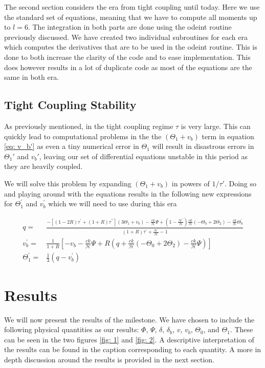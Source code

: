 \documentclass[a4paper, 10pt, reqno]{amsart}
\begin{document}
The second section considers the era from tight coupling until today. Here we use the standard set of equations, meaning that we have to compute all moments up to $l = 6$. The integration in both parts are done using the odeint routine previously discussed. We have created two individual subroutines for each era which computes the derivatives that are to be used in the odeint routine. This is done to both increase the clarity of the code and to ease implementation. This does however results in a lot of duplicate code as most of the equations are the same in both era. 

\subsection{Tight Coupling Stability}
As previously mentioned, in the tight coupling regime $\tau$ is very large. This can quickly lead to computational problems in the the $(\Theta_1 + v_b)$ term in equation \eqref{eq: v_b'} as even a tiny numerical error in $\Theta_1$ will result in disastrous errors in $\Theta_1'$ and $v_b'$, leaving our set of differential equations unstable in this period as they are heavily coupled.

We will solve this problem by expanding $(\Theta_1 + v_b)$ in powers of $1/\tau'$. Doing so and playing around with the equations results in the following new expressions for $\Theta_{1}^\prime$ and $v_{b}^\prime$ which we will need to use during this era

\begin{align} 
    q = & \frac{-\left[(1-2 R) \tau^{\prime}+(1+R) \tau^{\prime \prime}\right]\left(3 \Theta_{1}+v_{b}\right)-\frac{c k}{\mathcal{H}} \Psi+\left(1-\frac{\mathcal{H}^{\prime}}{\mathcal{H}}\right) \frac{c k}{\mathcal{H}}\left(-\Theta_{0}+2 \Theta_{2}\right)-\frac{c k}{\mathcal{H}} \Theta_{0}^{\prime}}{(1+R) \tau^{\prime}+\frac{\mathcal{H}^{\prime}}{\mathcal{H}}-1} \\ 
    v_{b}^{\prime} = & \frac{1}{1+R}\left[-v_{b}-\frac{c k}{\mathcal{H}} \Psi+R\left(q+\frac{c k}{\mathcal{H}}\left(-\Theta_{0}+2 \Theta_{2}\right)-\frac{c k}{\mathcal{H}} \Psi\right)\right] \\ \Theta_{1}^{\prime} = &\frac{1}{3}\left(q-v_{b}^{\prime}\right) 
\end{align}

\section{Results}
We will now present the results of the milestone. We have chosen to include the following physical quantities as our results: $\Phi$, $\Psi$, $\delta$, $\delta_b$, $v$, $v_b$, $\Theta_0$, and $\Theta_1$. These can be seen in the two figures \ref{fig: 1} and \ref{fig: 2}. A descriptive interpretation of the results can be found in the caption corresponding to each quantity. A more in depth discussion around the results is provided in the next section.
\end{document}
